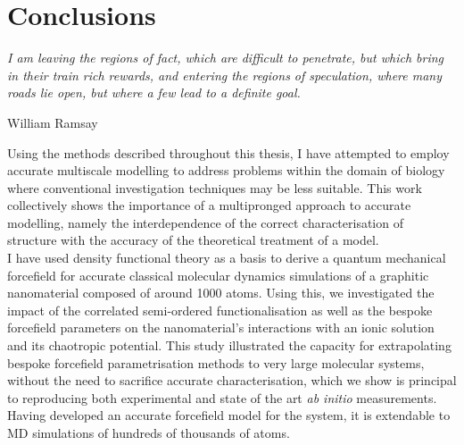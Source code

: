 \chapter{Conclusions}
\label{chapter:conclusions}

\epigraph{\textit{I am leaving the regions of fact, which are difficult to penetrate, but which bring in their train rich rewards, and entering the regions of speculation, where many roads lie open, but where a few lead to a definite goal.}}{William Ramsay}

Using the methods described throughout this thesis, I have attempted to employ accurate multiscale modelling to address problems within the domain of biology where conventional investigation techniques may be less suitable. This work collectively shows the importance of a multipronged approach to accurate modelling, namely the interdependence of the correct characterisation of structure with the accuracy of the theoretical treatment of a model. \\

I have used density functional theory as a basis to derive a quantum mechanical forcefield for accurate classical molecular dynamics simulations of a graphitic nanomaterial composed of around 1000 atoms. Using this, we investigated the impact of the correlated semi-ordered functionalisation as well as the bespoke forcefield parameters on the nanomaterial's interactions with an ionic solution and its chaotropic potential. This study illustrated the capacity for extrapolating bespoke forcefield parametrisation methods to very large molecular systems, without the need to sacrifice accurate characterisation, which we show is principal to reproducing both experimental and state of the art \textit{ab initio} measurements. Having developed an accurate forcefield model for the system, it is extendable to MD simulations of hundreds of thousands of atoms. \\

